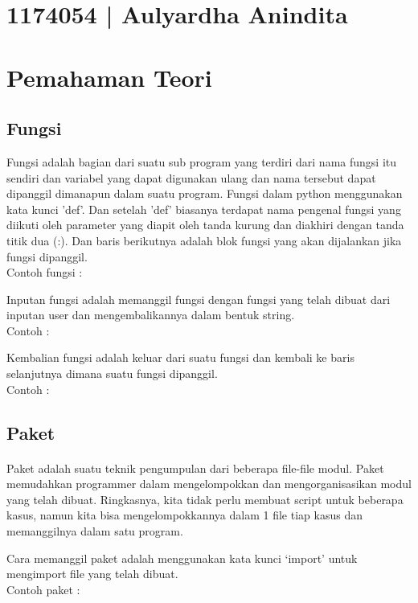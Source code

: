\section{1174054 | Aulyardha Anindita}
\section{Pemahaman Teori}
\subsection{Fungsi}
Fungsi adalah bagian dari suatu sub program yang terdiri dari nama fungsi itu sendiri dan variabel yang dapat digunakan ulang dan nama tersebut dapat dipanggil dimanapun dalam suatu program. Fungsi dalam python menggunakan kata kunci 'def'. Dan setelah 'def' biasanya terdapat nama pengenal fungsi yang diikuti oleh parameter yang diapit oleh tanda kurung dan diakhiri dengan tanda titik dua (:). Dan baris berikutnya adalah blok fungsi yang akan dijalankan jika fungsi dipanggil.\\
Contoh fungsi :


Inputan fungsi adalah memanggil fungsi dengan fungsi yang telah dibuat dari inputan user dan mengembalikannya dalam bentuk string. \\
Contoh :


Kembalian fungsi adalah keluar dari suatu fungsi dan kembali ke baris selanjutnya dimana suatu fungsi dipanggil.\\
Contoh :


\subsection{Paket}
\paragraph{}
Paket adalah suatu teknik pengumpulan dari beberapa file-file modul. Paket memudahkan programmer dalam mengelompokkan dan mengorganisasikan modul yang telah dibuat. Ringkasnya, kita tidak perlu membuat script untuk beberapa kasus, namun kita bisa mengelompokkannya dalam 1 file tiap kasus dan memanggilnya dalam satu program.

Cara memanggil paket adalah menggunakan kata kunci ‘import’ untuk mengimport file yang telah dibuat.\\
Contoh paket :



